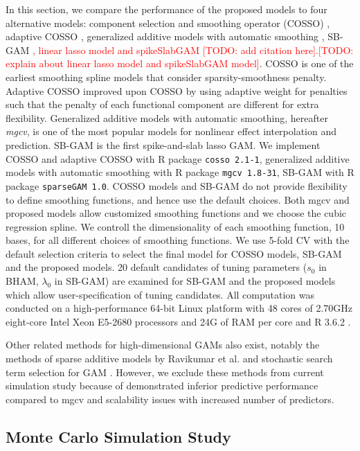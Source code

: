 \documentclass[AMA,STIX1COL,]{WileyNJD-v2}
\begin{document}
In this section, we compare the performance of the proposed models to
four alternative models: component selection and smoothing operator
(COSSO) \citep{Zhang2006GAM}, adaptive COSSO \citep{Storlie2011},
generalized additive models with automatic smoothing \citep{Wood2011},
SB-GAM
\citep{Bai2021}\textcolor{red}{, linear lasso model and spikeSlabGAM [TODO: add citation here].[TODO: explain about linear lasso model and spikeSlabGAM model]}.
COSSO is one of the earliest smoothing spline models that consider
sparsity-smoothness penalty. Adaptive COSSO improved upon COSSO by using
adaptive weight for penalties such that the penalty of each functional
component are different for extra flexibility. Generalized additive
models with automatic smoothing, hereafter \textit{mgcv}, is one of the
most popular models for nonlinear effect interpolation and prediction.
SB-GAM is the first spike-and-slab lasso GAM. We implement COSSO and
adaptive COSSO with R package \texttt{cosso 2.1-1}, generalized additive
models with automatic smoothing with R package \texttt{mgcv 1.8-31},
SB-GAM with R package \texttt{sparseGAM 1.0}. COSSO models and SB-GAM do
not provide flexibility to define smoothing functions, and hence use the
default choices. Both mgcv and proposed models allow customized
smoothing functions and we choose the cubic regression spline. We
controll the dimensionality of each smoothing function, 10 bases, for
all different choices of smoothing functions. We use 5-fold CV with the
default selection criteria to select the final model for COSSO models,
SB-GAM and the proposed models. 20 default candidates of tuning
parameters (\(s_0\) in BHAM, \(\lambda_0\) in SB-GAM) are examined for
SB-GAM and the proposed models which allow user-specification of tuning
candidates. All computation was conducted on a high-performance 64-bit
Linux platform with 48 cores of 2.70GHz eight-core Intel Xeon E5-2680
processors and 24G of RAM per core and R 3.6.2 \citep{R}.

Other related methods for high-dimensional GAMs also exist, notably the
methods of sparse additive models by Ravikumar et al.
\citep{Ravikumar2009} and stochastic search term selection for GAM
\citep{Scheipl2012}. However, we exclude these methods from current
simulation study because of demonstrated inferior predictive performance
compared to mgcv and scalability issues with increased number of
predictors. \citep{Scheipl2013}

\subsection{Monte Carlo Simulation Study}
\end{document}
